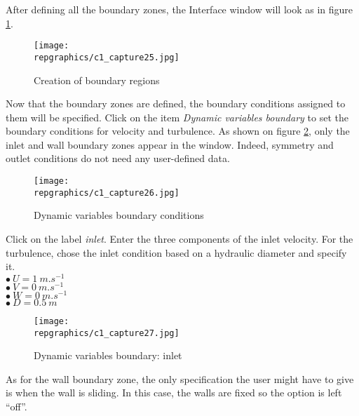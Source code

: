 After defining all the boundary zones, the Interface window will look as in
figure \ref{fig25_e1}.

\begin{figure}[ht]
\begin{center}
\texttt{[image: \\repgraphics/c1\_capture25.jpg]}
\caption{Creation of boundary regions}
\label{fig25_e1}
\end{center}
\end{figure}


\clearpage
Now that the boundary zones are defined, the boundary conditions assigned to
them will be specified. Click on the item
{\itshape Dynamic variables boundary} to set the boundary conditions for
velocity and turbulence. As shown on figure \ref{fig26_e1}, only the inlet and
wall boundary zones appear in the window. Indeed, symmetry and outlet conditions
do not need any user-defined data.

\begin{figure}[ht]
\begin{center}
\texttt{[image: \\repgraphics/c1\_capture26.jpg]}
\caption{Dynamic variables boundary conditions}
\label{fig26_e1}
\end{center}
\end{figure}


\clearpage
Click on the label {\itshape inlet}. Enter the three components of the inlet
velocity. For the turbulence, chose the inlet condition based on a hydraulic
diameter and specify it.\\
\hspace*{1cm}$\bullet\ U = 1\ m.s^{-1}$\\
\hspace*{1cm}$\bullet\ V = 0\ m.s^{-1}$\\
\hspace*{1cm}$\bullet\ W = 0\ m.s^{-1}$\\
\hspace*{1cm}$\bullet\ D = 0.5\ m$

\begin{figure}[ht]
\begin{center}
\texttt{[image: \\repgraphics/c1\_capture27.jpg]}
\caption{Dynamic variables boundary: inlet}
\label{fig27_e1}
\end{center}
\end{figure}


\clearpage
As for the wall boundary zone, the only specification the user might have to
give is when the wall is sliding. In this case, the walls are fixed so the
option is left ``off''.

